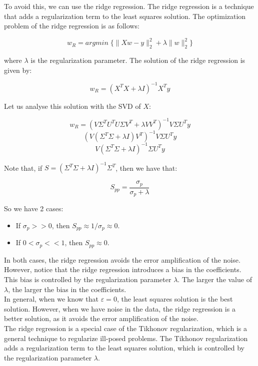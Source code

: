 To avoid this, we can use the ridge regression. The ridge regression is a technique that adds a 
regularization term to the least squares solution. The optimization problem of the ridge regression is as follows:

\begin{equation}
    w_{R} = argmin \; \{ \|X w - y\|_2^2 + \lambda \|w\|_2^2 \}
\end{equation}

where $\lambda$ is the regularization parameter. The solution of the ridge regression is given by:

\begin{equation}
    w_{R} = (X^T X + \lambda I)^{-1} X^T y
\end{equation}

Let us analyse this solution with the SVD of $X$:

$$w_R = (V \Sigma^T U^T U \Sigma V^T + \lambda V V^T)^{-1} V \Sigma U^T y$$
$$(V (\Sigma^T \Sigma + \lambda I) V^T)^{-1} V \Sigma U^T y$$
$$V (\Sigma^T \Sigma + \lambda I)^{-1} \Sigma U^T y$$

Note that, if $S = (\Sigma^T \Sigma + \lambda I)^{-1} \Sigma^T$, then we have that:

$$S_{pp} = \frac{\sigma_p}{\sigma_p + \lambda}$$

So we have 2 cases:

\begin{itemize}
    \item If $\sigma_p >> 0$, then $S_{pp} \approx 1/\sigma_p \approx 0$.
    \item If $0 < \sigma_p << 1$, then $S_{pp} \approx 0$.
\end{itemize}

In both cases, the ridge regression avoids the error amplification of the noise. However, notice
that the ridge regression introduces a bias in the coefficients. This bias is controlled by the
regularization parameter $\lambda$. The larger the value of $\lambda$, the larger the bias in the
coefficients.\\

In general, when we know that $\varepsilon = 0$, the least squares solution is the best solution.
However, when we have noise in the data, the ridge regression is a better solution, as it avoids
the error amplification of the noise.\\

The ridge regression is a special case of the Tikhonov regularization, which is a general technique
to regularize ill-posed problems. The Tikhonov regularization adds a regularization term to the
least squares solution, which is controlled by the regularization parameter $\lambda$.

